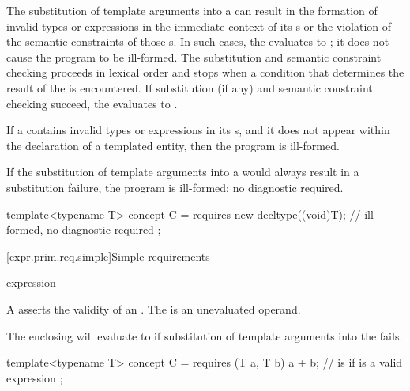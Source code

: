 \pnum
The substitution of template arguments into a 
can result in
the formation of invalid types or expressions in the immediate context of
its s or
the violation of the semantic constraints of those s.
In such cases, the  evaluates to ;
it does not cause the program to be ill-formed.
The substitution and semantic constraint checking
proceeds in lexical order and stops when a condition that
determines the result of the  is encountered.
If substitution (if any) and semantic constraint checking succeed,
the  evaluates to .
\begin{note}
If a  contains invalid types or expressions in
its s, and it does not appear within the declaration of a templated
entity, then the program is ill-formed.
\end{note}
If the substitution of template arguments into a 
would always result in a substitution failure, the program is ill-formed;
no diagnostic required.
\begin{example}
\begin{codeblock}
template<typename T> concept C =
requires {
  new decltype((void)T{});      // ill-formed, no diagnostic required
};
\end{codeblock}
\end{example}

[expr.prim.req.simple]{Simple requirements}
%

\begin{bnf}
\br
    expression \terminal{;}
\end{bnf}

\pnum
A  asserts
the validity of an .
The  is an unevaluated operand.
\begin{note}
The enclosing  will evaluate to 
if substitution of template arguments into the  fails.
\end{note}
\begin{example}
\begin{codeblock}
template<typename T> concept C =
  requires (T a, T b) {
    a + b;          //  is  if  is a valid expression
  };
\end{codeblock}
\end{example}

